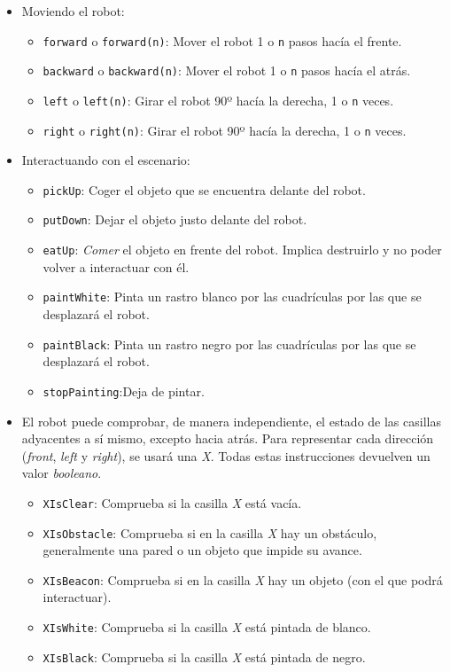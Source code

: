 \begin{itemize}
\item Moviendo el robot:
	\begin{itemize}
	\item  \texttt{forward} o \texttt{forward(n)}: Mover el robot 1 o \texttt{n} pasos hacía el frente.
	\item \texttt{backward} o \texttt{backward(n)}: Mover el robot 1 o \texttt{n} pasos hacía el atrás.
	\item \texttt{left} o \texttt{left(n)}: Girar el robot 90º hacía la derecha, 1 o \texttt{n} veces.
	\item \texttt{right} o \texttt{right(n)}: Girar el robot 90º hacía la derecha, 1 o \texttt{n} veces.
	\end{itemize}
\item Interactuando con el escenario:
	\begin{itemize}
		\item \texttt{pickUp}: Coger el objeto que se encuentra delante del robot.
		\item \texttt{putDown}: Dejar el objeto justo delante del robot.
		\item  \texttt{eatUp}: \emph{Comer} el objeto en frente del robot. Implica destruirlo y no poder volver a interactuar con él.
		\item \texttt{paintWhite}:  Pinta un rastro blanco por las cuadrículas por las que se desplazará el robot.
		\item \texttt{paintBlack}: Pinta un rastro negro por las cuadrículas por las que se desplazará el robot.
		\item  \texttt{stopPainting}:Deja de pintar.
	\end{itemize}	
\item El robot puede comprobar, de manera independiente, el estado de las casillas adyacentes a sí mismo, excepto hacia atrás. Para representar cada dirección (\emph{front}, \emph{left} y \emph{right}), se usará una \emph{X}. Todas estas instrucciones devuelven un valor \emph{booleano}.
	\begin{itemize}
		\item \texttt{XIsClear}:  Comprueba si la casilla \emph{X} está vacía.
		\item \texttt{XIsObstacle}:  Comprueba si en la casilla \emph{X} hay un obstáculo, generalmente una pared o un objeto que impide su avance.
		\item \texttt{XIsBeacon}:  Comprueba si en la casilla \emph{X} hay un objeto (con el que podrá interactuar).
		\item \texttt{XIsWhite}:  Comprueba si la casilla \emph{X} está pintada de blanco.
		\item \texttt{XIsBlack}:  Comprueba si la casilla \emph{X} está pintada de negro.
	\end{itemize}	
\end{itemize}

